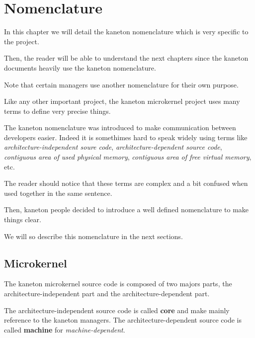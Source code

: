 
%
%

\chapter{Nomenclature}

In this chapter we will detail the kaneton nomenclature which is very
specific to the project.

Then, the reader will be able to understand the next chapters since the
kaneton documents heavily use the kaneton nomenclature.

Note that certain managers use another nomenclature for their own
purpose.

\newpage

%
%

Like any other important project, the kaneton microkernel project
uses many terms to define very precise things.

The kaneton nomenclature was introduced to make communication between
developers easier. Indeed it is somethimes hard to speak widely using
terms like \textit{architecture-independent soure code},
\textit{architecture-dependent source code},
\textit{contiguous area of used physical memory},
\textit{contiguous area of free virtual memory}, etc.

The reader should notice that these terms are complex and a bit confused
when used together in the same sentence.

Then, kaneton people decided to introduce a well defined nomenclature
to make things clear.

We will so describe this nomenclature in the next sections.

%
%

\section{Microkernel}

The kaneton microkernel source code is composed of two majors parts, the
architecture-independent part and the architecture-dependent part.

The architecture-independent source code is called \textbf{core} and
make mainly reference to the kaneton managers. The architecture-dependent
source code is called \textbf{machine} for \textit{machine-dependent}.

